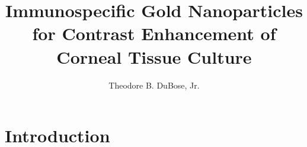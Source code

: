 \documentclass{hmcthesis}
\title{Immunospecific Gold Nanoparticles for Contrast Enhancement of Corneal Tissue Culture}
\author{Theodore B. DuBose, Jr.}
\begin{document}
\frontmatter


\maketitle




\begin{abstract}

\end{abstract}




\begin{acknowledgments}
  
\end{acknowledgments}





\tableofcontents
\listoffigures
\listoftables
\mainmatter
\chapter{Introduction}
\label{introduction}
\end{document}

